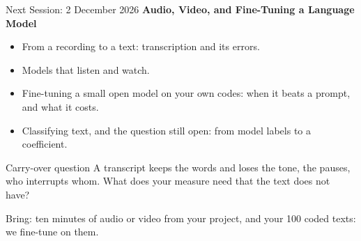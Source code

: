 \documentclass[svgnames,x11names,dvipsnames]{beamer}
\newcommand{\chg}[1]{{\bfseries #1}}
\renewcommand{\chg}[1]{#1}
\newcommand{\new}[1]{#1}
\begin{document}
\begin{frame}{\chg{Next Session: 2 December 2026}}
\textbf{Audio, Video, \chg{and Fine-Tuning a Language Model}}

\vspace{0.3cm}
\begin{itemize}
    \setlength{\itemsep}{4pt}
    \item From a recording to a text: transcription and its errors.
    \item Models that listen and watch.
    \item \chg{Fine-tuning a small open model on your own codes: when it beats a prompt, and what it costs.}
    \item \new{Classifying text, and the question still open: from model labels to a coefficient.}
\end{itemize}

\vspace{0.2cm}
\begin{alertblock}{Carry-over question}
A transcript keeps the words and loses the tone, the pauses, who interrupts whom. What does your measure need that the text does not have?
\end{alertblock}

\vspace{0.2cm}
{\footnotesize Bring: ten minutes of audio or video from your project\chg{, and your 100 coded texts: we fine-tune on them}.}
\end{frame}
\end{document}
